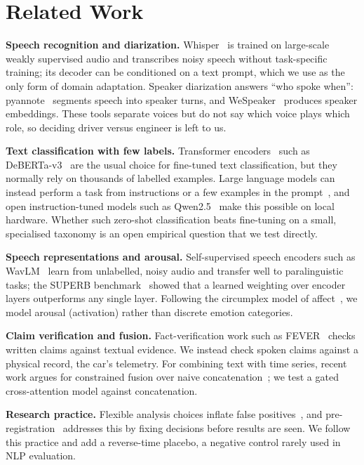 \section{Related Work}
\label{sec:related}

\textbf{Speech recognition and diarization.} Whisper~\cite{radford2023whisper} is trained on large-scale weakly supervised audio and transcribes noisy speech without task-specific training; its decoder can be conditioned on a text prompt, which we use as the only form of domain adaptation. Speaker diarization answers ``who spoke when'': pyannote~\cite{bredin2023pyannote,plaquet2023powerset} segments speech into speaker turns, and WeSpeaker~\cite{wang2023wespeaker} produces speaker embeddings. These tools separate voices but do not say which voice plays which role, so deciding driver versus engineer is left to us.

\textbf{Text classification with few labels.} Transformer encoders~\cite{vaswani2017attention} such as DeBERTa-v3~\cite{he2023debertav3} are the usual choice for fine-tuned text classification, but they normally rely on thousands of labelled examples. Large language models can instead perform a task from instructions or a few examples in the prompt~\cite{brown2020gpt3}, and open instruction-tuned models such as Qwen2.5~\cite{qwen2025qwen25} make this possible on local hardware. Whether such zero-shot classification beats fine-tuning on a small, specialised taxonomy is an open empirical question that we test directly.

\textbf{Speech representations and arousal.} Self-supervised speech encoders such as WavLM~\cite{chen2022wavlm} learn from unlabelled, noisy audio and transfer well to paralinguistic tasks; the SUPERB benchmark~\cite{yang2021superb} showed that a learned weighting over encoder layers outperforms any single layer. Following the circumplex model of affect~\cite{russell1980circumplex}, we model arousal (activation) rather than discrete emotion categories.

\textbf{Claim verification and fusion.} Fact-verification work such as FEVER~\cite{thorne2018fever} checks written claims against textual evidence. We instead check spoken claims against a physical record, the car's telemetry. For combining text with time series, recent work argues for constrained fusion over naive concatenation~\cite{lee2026cfa}; we test a gated cross-attention model against concatenation.

\textbf{Research practice.} Flexible analysis choices inflate false positives~\cite{simmons2011false}, and pre-registration~\cite{nosek2018prereg} addresses this by fixing decisions before results are seen. We follow this practice and add a reverse-time placebo, a negative control rarely used in NLP evaluation.
